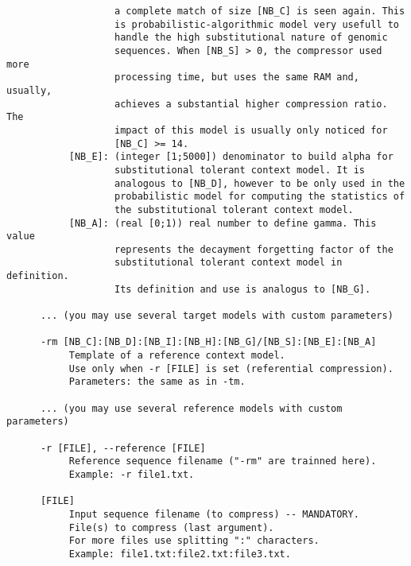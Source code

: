 \begin{lstlisting}
                   a complete match of size [NB_C] is seen again. This  
                   is probabilistic-algorithmic model very usefull to   
                   handle the high substitutional nature of genomic     
                   sequences. When [NB_S] > 0, the compressor used more 
                   processing time, but uses the same RAM and, usually, 
                   achieves a substantial higher compression ratio. The 
                   impact of this model is usually only noticed for     
                   [NB_C] >= 14.                                        
           [NB_E]: (integer [1;5000]) denominator to build alpha for    
                   substitutional tolerant context model. It is         
                   analogous to [NB_D], however to be only used in the  
                   probabilistic model for computing the statistics of  
                   the substitutional tolerant context model.           
           [NB_A]: (real [0;1)) real number to define gamma. This value 
                   represents the decayment forgetting factor of the    
                   substitutional tolerant context model in definition. 
                   Its definition and use is analogus to [NB_G].        
                                                                        
      ... (you may use several target models with custom parameters)    
                                                                        
      -rm [NB_C]:[NB_D]:[NB_I]:[NB_H]:[NB_G]/[NB_S]:[NB_E]:[NB_A]       
           Template of a reference context model.                       
           Use only when -r [FILE] is set (referential compression).    
           Parameters: the same as in -tm.                              
                                                                        
      ... (you may use several reference models with custom parameters) 
                                                                        
      -r [FILE], --reference [FILE]                                     
           Reference sequence filename ("-rm" are trainned here).     
           Example: -r file1.txt.                                       
                                                                        
      [FILE]                                                            
           Input sequence filename (to compress) -- MANDATORY.          
           File(s) to compress (last argument).                         
           For more files use splitting ":" characters.               
           Example: file1.txt:file2.txt:file3.txt.
\end{lstlisting}
